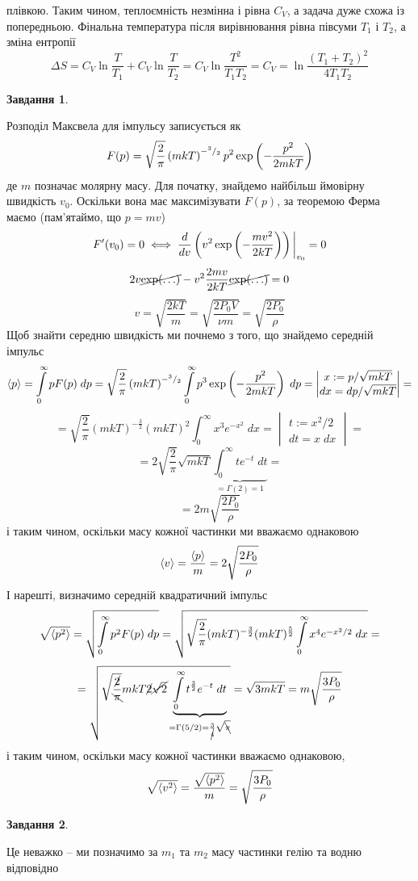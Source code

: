 \documentclass[12pt]{article} %
\newtheorem{prob}{Завдання}
\newcommand{\dt}{\;dt}
\newcommand{\dx}{\;dx}
\newcommand{\dpp}{\;dp}
\begin{document}
	плівкою. Таким чином, теплоємність незмінна і рівна $C_V$, а задача дуже схожа із попередньою. Фінальна температура після вирівнювання
	рівна півсуми $T_1$ і $T_2$, а зміна ентропії
	\[\Delta S=C_V\ln\frac{T}{T_1}+C_V\ln\frac{T}{T_2}=C_V\ln\frac{T^2}{T_1T_2}=C_V=\ln\frac{(T_1+T_2)^2}{4T_1T_2}\]
\setcounter{prob}{0}
\begin{prob}\end{prob}%
	Розподіл Максвела для імпульсу записується як
	\[F(p)=\sqrt{\frac{2}{\pi}}\left(mkT\right)^{-{^{3}/_{2}}}p^2\exp\left(-\frac{p^2}{2mkT}\right)\]
	де $m$ позначає молярну масу. Для початку, знайдемо найбільш ймовірну швидкість $v_0$. Оскільки вона має максимізувати $F(p)$, за
	теоремою Ферма маємо (пам’ятаймо, що $p=mv$)
	\[F'(v_0)=0\iff \frac{d}{dv}\left(v^2\exp\left(-\frac{mv^2}{2kT}\right)\right)\bigg|_{v_0}=0\]
	\[2v\cancel{\exp(\hdots)}-v^2\frac{2mv}{2kT}\cancel{\exp(\hdots)}=0\]
	\[v=\sqrt{\frac{2kT}{m}}=\sqrt{\frac{2P_0V}{\nu m}}=\sqrt{\frac{2P_0}{\rho}}\]
	Щоб знайти середню швидкість ми почнемо з того, що знайдемо середній імпульс
	\[\myabra{p}=\int_0^{\infty}pF(p)\dpp=\sqrt{\frac{2}{\pi}}\mybra{mkT}^{-\myfrac{3}{2}}
	\int_0^\infty p^3\exp\mybra{-\frac{p^2}{2mkT}}\dpp=\begin{vmatrix}x:=p/\sqrt{mkT}\\dx=dp/\sqrt{mkT}\end{vmatrix}=\]
	\[=\sqrt{\frac{2}{\pi}}(mkT)^{-\frac{3}{2}}(mkT)^2\int_0^\infty x^3e^{-x^2}\dx=
	\begin{vmatrix}t:=x^2/2\\dt=x\;dx\end{vmatrix}=\]
	\[=2\sqrt{\frac{2}{\pi}}\sqrt{mkT}\underbrace{\int_0^\infty te^{-t}\dt}_{=\Gamma(2)=1}=\]
	\[=2m\sqrt{\frac{2P_0}{\rho}}\]
	і таким чином, оскільки масу кожної частинки ми вважаємо однаковою
	\[\left<v\right>=\frac{\left<p\right>}{m}=2\sqrt{\frac{2P_0}{\rho}}\]
	І нарешті, визначимо середній квадратичний імпульс
	\[\sqrt{\myabra{p^2}}=\sqrt{\int_0^\infty p^2F(p)\dpp}=\sqrt{\sqrt{\frac{2}{\pi}}(mkT)^{-\frac{3}{2}}(mkT)^{\frac{5}{2}}
	\int_0^\infty x^4e^{-x^2/2}\dx}=\]
	\[=\sqrt{\sqrt{\frac{\cancel{2}}{\bcancel{\pi}}}mkT\cancel{2}\cancel{\sqrt{2}}\underbrace{\int_0^\infty t^{\frac{3}{2}}e^{-t}\dt}_{=\Gamma(5/2)=\frac{3}{\cancel{4}}
	\sqrt{\bcancel{\pi}}}}=\sqrt{3mkT}=m\sqrt{\frac{3P_0}{\rho}}\]
	і таким чином, оскільки масу кожної частинки вважаємо однаковою,
	\[\sqrt{\left<v^2\right>}=\frac{\sqrt{\left<p^2\right>}}{m}=\sqrt{\frac{3P_0}{\rho}}\]
\begin{prob}\end{prob}%
	Це неважко -- ми позначимо за $m_1$ та $m_2$ масу частинки гелію та водню відповідно
\end{document}
